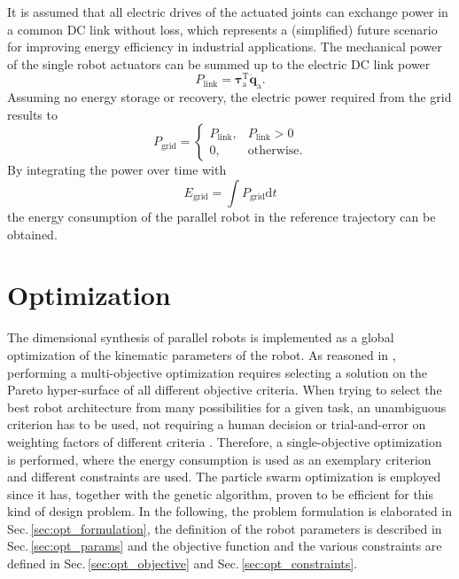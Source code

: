 \documentclass[fleqn,a4paper,10pt]{article}
\newcommand{\bm}[1]{\mathbf{#1}}
\newcommand{\transp}[0]{{\mathrm{T}}}
\begin{document}
\begin{multicols}{2}
It is assumed that all electric drives of the actuated joints can exchange power in a common DC link without loss, which represents a (simplified) future scenario for improving energy efficiency in industrial applications.
The mechanical power of the single robot actuators can be summed up to the electric DC link power
%
\begin{equation}
P_{\mathrm{link}}=\bm{\tau}_\mathrm{a}^\transp \dot{\bm{q}}_\mathrm{a}.
\label{equ:power_link_mech}
\end{equation}
%
Assuming no energy storage or recovery, the electric power required from the grid results to
%
\begin{equation}
P_{\mathrm{grid}}=\left\{\begin{array}{ll} P_{\mathrm{link}}, & P_{\mathrm{link}}>0 \\0, & \mathrm{otherwise.}\end{array}\right.
\label{equ:power_link_grid}
\end{equation}
%
By integrating the power over time with
%
\begin{equation}
E_{\mathrm{grid}}=\int{} P_{\mathrm{grid}}\mathrm{d} t
\label{equ:energy_integral}
\end{equation}
%
the energy consumption of the parallel robot in the reference trajectory can be obtained.

\section{Optimization}
\label{sec:opti}

The dimensional synthesis of parallel robots is implemented as a global optimization of the kinematic parameters of the robot.
As reasoned in \cite{JamwalHusXie2015,Ramirez2018}, performing a multi-objective optimization requires selecting a solution on the Pareto hyper-surface of all different objective criteria.
When trying to select the best robot architecture from many possibilities for a given task, an unambiguous criterion has to be used, not requiring a human decision \cite{Ramirez2018} or trial-and-error on weighting factors of different criteria \cite{JamwalHusXie2015}.
Therefore, a single-objective optimization is performed, where the energy consumption is used as an exemplary criterion and different constraints are used.
The particle swarm optimization is employed since it has, together with the genetic algorithm, proven to be efficient for this kind of design problem.
In the following, the problem formulation is elaborated in Sec.\,\ref{sec:opt_formulation}, the definition of the robot parameters is described in Sec.\,\ref{sec:opt_params} and the objective function and the various constraints are defined in Sec.\,\ref{sec:opt_objective} and Sec.\,\ref{sec:opt_constraints}.



\end{multicols}
\end{document}
